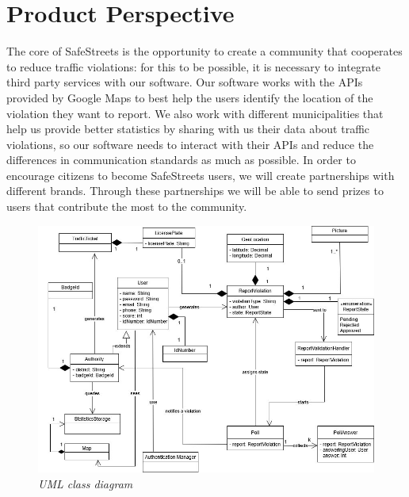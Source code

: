 \section{Product Perspective}
The core of SafeStreets is the opportunity to create a community that cooperates to reduce traffic violations: for this to be possible, it is necessary to integrate third party services with our software. 
Our software works with the APIs provided by Google Maps to best help the users identify the location of the violation they want to report.
We also work with different municipalities that help us provide better statistics by sharing with us their data about traffic violations, so our software needs to interact with their APIs and reduce the differences in communication standards as much as possible.
In order to encourage citizens to become SafeStreets users, we will create partnerships with different brands. Through these partnerships we will be able to send prizes to users that contribute the most to the community.

\begin{figure}[ht!]
  \centering
  \includegraphics[width=\textwidth]{RASD_Images/uml.jpg}
  \caption{\textit{UML class diagram}}
\end{figure}
\newpage

